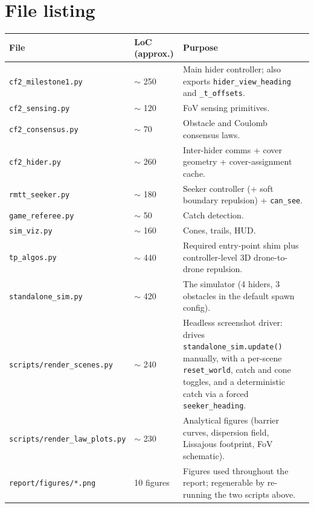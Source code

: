 \documentclass[11pt,a4paper]{article}
\newcommand{\code}[1]{\texttt{#1}}
\begin{document}
\appendix
\section{File listing}

\begin{longtable}{p{4.5cm}p{2.5cm}p{8cm}}
\toprule
\textbf{File} & \textbf{LoC (approx.)} & \textbf{Purpose} \\
\midrule
\code{cf2\_milestone1.py} & $\sim$ 250 & Main hider controller; also exports
\code{hider\_view\_heading} and \code{\_t\_offsets}. \\
\code{cf2\_sensing.py}    & $\sim$ 120 & FoV sensing primitives. \\
\code{cf2\_consensus.py}  & $\sim$ 70  & Obstacle and Coulomb consensus laws. \\
\code{cf2\_hider.py}      & $\sim$ 260 & Inter-hider comms + cover geometry +
cover-assignment cache. \\
\code{rmtt\_seeker.py}    & $\sim$ 180 & Seeker controller (+ soft boundary repulsion) + \code{can\_see}. \\
\code{game\_referee.py}   & $\sim$ 50  & Catch detection. \\
\code{sim\_viz.py}        & $\sim$ 160 & Cones, trails, HUD. \\
\code{tp\_algos.py}       & $\sim$ 440 & Required entry-point shim plus
controller-level 3D drone-to-drone repulsion. \\
\code{standalone\_sim.py} & $\sim$ 420 & The simulator (4 hiders, 3 obstacles
in the default spawn config). \\
\code{scripts/render\_scenes.py}    & $\sim$ 240 & Headless screenshot driver:
drives \code{standalone\_sim.update()} manually, with a per-scene
\code{reset\_world}, catch and cone toggles, and a deterministic catch via
a forced \code{seeker\_heading}. \\
\code{scripts/render\_law\_plots.py}& $\sim$ 230 & Analytical figures
(barrier curves, dispersion field, Lissajous footprint, FoV schematic). \\
\code{report/figures/*.png}         & 10 figures & Figures used throughout the
report; regenerable by re-running the two scripts above. \\
\bottomrule
\end{longtable}
\end{document}
